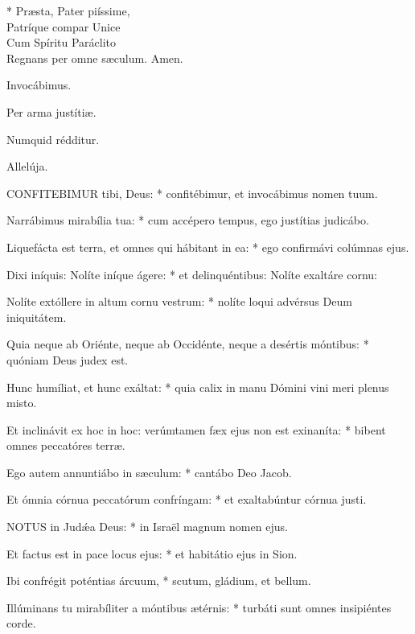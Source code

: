 * Præsta, Pater piíssime,\\
Patríque compar Unice\\
Cum Spíritu Paráclito\\
Regnans per omne sæculum. Amen.

  Invocábimus.



 Per arma justítiæ.


 Numquid rédditur.

  Allelúja.


\lettrine[lines=2]{C}{ONFITEBIMUR} tibi, Deus: * confitébimur, et invocábimus nomen tuum.

Narrábimus mirabília tua: * cum accépero tempus, ego justítias judicábo.

Liquefácta est terra, et omnes qui hábitant in ea: * ego confirmávi colúmnas ejus.

Dixi iníquis: Nolíte iníque ágere: * et delinquéntibus: Nolíte exaltáre cornu:

Nolíte extóllere in altum cornu vestrum: * nolíte loqui advérsus Deum iniquitátem.

Quia neque ab Oriénte, neque ab Occidénte, neque a desértis móntibus: * quóniam Deus judex est.

Hunc humíliat, et hunc exáltat: * quia calix in manu Dómini vini meri plenus misto.

Et inclinávit ex hoc in hoc: verúmtamen fæx ejus non est exinaníta: * bibent omnes peccatóres terræ.

Ego autem annuntiábo in sæculum: * cantábo Deo Jacob.

Et ómnia córnua peccatórum confríngam: * et exaltabúntur córnua justi.


\lettrine[lines=2]{N}{OTUS} in Judǽa Deus: * in Israël magnum nomen ejus.

Et factus est in pace locus ejus: * et habitátio ejus in Sion.

Ibi confrégit poténtias árcuum, * scutum, gládium, et bellum.

Illúminans tu mirabíliter a móntibus ætérnis: * turbáti sunt omnes insipiéntes corde.

